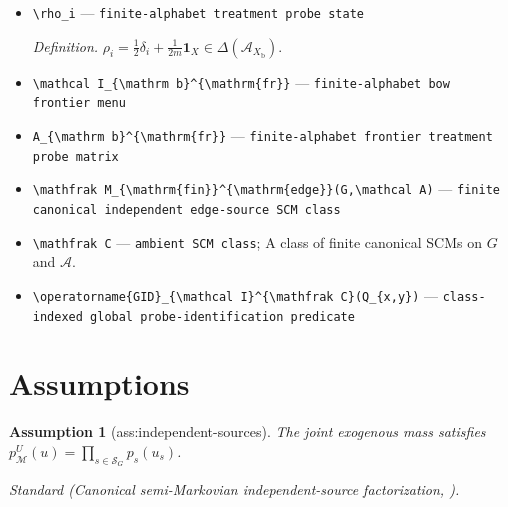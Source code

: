 \documentclass{article}
\newtheorem{assumption}{Assumption}
\begin{document}
\begin{itemize}
  \item \texttt{\textbackslash{}\allowbreak{}rho\_\allowbreak{}i} --- \texttt{finite-\allowbreak{}alphabet treatment probe state}
  \par\smallskip\noindent\emph{Definition.} \(\rho_i=\tfrac12\delta_i+\tfrac1{2m}\mathbf 1_X\in\Delta(\mathcal A_{X_{\mathrm b}})\).
  \item \texttt{\textbackslash{}\allowbreak{}mathcal I\_\allowbreak{}\{\textbackslash{}\allowbreak{}mathrm b\}\allowbreak{}\textasciicircum{}\{\textbackslash{}\allowbreak{}mathrm\{fr\}\allowbreak{}\}\allowbreak{}} --- \texttt{finite-\allowbreak{}alphabet bow frontier menu}
  \item \texttt{A\_\allowbreak{}\{\textbackslash{}\allowbreak{}mathrm b\}\allowbreak{}\textasciicircum{}\{\textbackslash{}\allowbreak{}mathrm\{fr\}\allowbreak{}\}\allowbreak{}} --- \texttt{finite-\allowbreak{}alphabet frontier treatment probe matrix}
  \item \texttt{\textbackslash{}\allowbreak{}mathfrak M\_\allowbreak{}\{\textbackslash{}\allowbreak{}mathrm\{fin\}\allowbreak{}\}\allowbreak{}\textasciicircum{}\{\textbackslash{}\allowbreak{}mathrm\{edge\}\allowbreak{}\}\allowbreak{}(G,\allowbreak{}\textbackslash{}\allowbreak{}mathcal A)} --- \texttt{finite canonical independent edge-\allowbreak{}source SCM class}
  \item \texttt{\textbackslash{}\allowbreak{}mathfrak C} --- \texttt{ambient SCM class}; A class of finite canonical SCMs on \(G\) and \(\mathcal A\).
  \item \texttt{\textbackslash{}\allowbreak{}operatorname\{GID\}\allowbreak{}\_\allowbreak{}\{\textbackslash{}\allowbreak{}mathcal I\}\allowbreak{}\textasciicircum{}\{\textbackslash{}\allowbreak{}mathfrak C\}\allowbreak{}(Q\_\allowbreak{}\{x,\allowbreak{}y\}\allowbreak{})} --- \texttt{class-\allowbreak{}indexed global probe-\allowbreak{}identification predicate}
\end{itemize}

\section{Assumptions}

\begin{assumption}[ass:independent-sources]\label{ass:independent-sources}
The joint exogenous mass satisfies \(p_{\mathcal M}^{U}(u)=\prod_{s\in\mathcal S_G}p_s(u_s)\).
\par\smallskip\noindent\emph{Standard} (Canonical semi-Markovian independent-source factorization, \cite{ShpitserPearl2006}).
\end{assumption}
\end{document}
